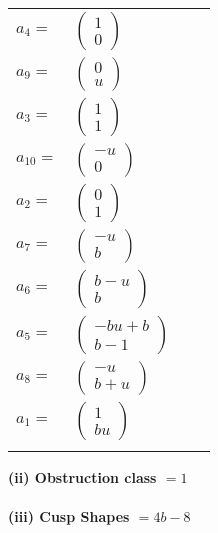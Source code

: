 \documentclass[1p]{elsarticle_modified}
\theoremstyle{definition}
\begin{document}
\begin{tabular}{m{7pt} m{180pt} m{7pt} m{180pt} }
\flushright $a_{4}=$&$\begin{pmatrix}1\\0\end{pmatrix}$ \\
\flushright $a_{9}=$&$\begin{pmatrix}0\\u\end{pmatrix}$ \\
\flushright $a_{3}=$&$\begin{pmatrix}1\\1\end{pmatrix}$ \\
\flushright $a_{10}=$&$\begin{pmatrix}- u\\0\end{pmatrix}$ \\
\flushright $a_{2}=$&$\begin{pmatrix}0\\1\end{pmatrix}$ \\
\flushright $a_{7}=$&$\begin{pmatrix}- u\\b\end{pmatrix}$ \\
\flushright $a_{6}=$&$\begin{pmatrix}b- u\\b\end{pmatrix}$ \\
\flushright $a_{5}=$&$\begin{pmatrix}- b u+b\\b-1\end{pmatrix}$ \\
\flushright $a_{8}=$&$\begin{pmatrix}- u\\b+u\end{pmatrix}$ \\
\flushright $a_{1}=$&$\begin{pmatrix}1\\b u\end{pmatrix}$\\&\end{tabular}
\flushleft \textbf{(ii) Obstruction class $= 1$}\\~\\
\flushleft \textbf{(iii) Cusp Shapes $= 4 b-8$}\\~\\
\end{document}
